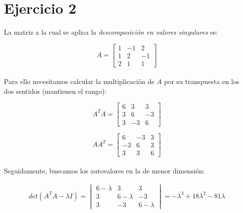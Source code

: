 \documentclass[a4paper, spanish]{article}
\begin{document}
  \section{Ejercicio 2}

  \paragraph{}
  La matriz a la cual se aplica la \emph{descomposición en valores singulares} es:

  \begin{equation}
    A =
    \begin{bmatrix}
      1 & -1 & 2\\
      1 & 2 & -1\\
      2 & 1 & 1
    \end{bmatrix}
  \end{equation}

  \paragraph{}
  Para ello necesitamos calcular la multiplicación de $A$ por su transpuesta en los dos sentidos (mantienen el rango):

  \begin{equation}
    A^TA =
    \begin{bmatrix}
      6 & 3 & 3 \\
      3 & 6 & -3 \\
      3 & -3 & 6
    \end{bmatrix}
  \end{equation}

  \begin{equation}
    AA^T =
    \begin{bmatrix}
      6 & -3 & 3 \\
      -3 & 6 & 3 \\
      3 & 3 & 6
    \end{bmatrix}
  \end{equation}

  \paragraph{}
  Seguidamente, buscamos los autovalores en la de menor dimensión:

  \begin{align}
    det(A^T A - \lambda I)
    = \begin{vmatrix}
      6-\lambda & 3 & 3 \\
      3 & 6-\lambda & -3 \\
      3 & -3 & 6-\lambda
    \end{vmatrix}
    = -\lambda^3 + 18 \lambda ^ 2 - 81 \lambda
  \end{align}
\end{document}
